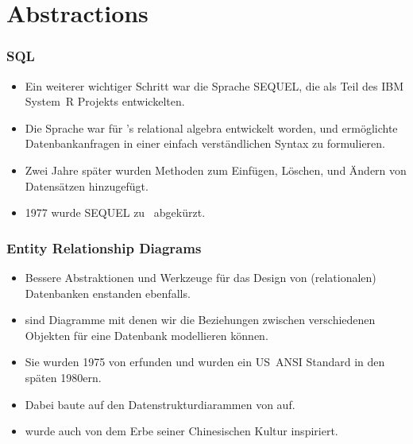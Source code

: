 \documentclass[aspectratio=169,mathserif,notheorems]{beamer}%
\begin{document}
\section{Abstractions}%
%
\begin{frame}[fragile,t]
\frametitle{SQL}%
\begin{itemize}%
\item Ein weiterer wichtiger Schritt war die Sprache SEQUEL, die \citeauthor{CB1974SASEQL} \citeyear{CB1974SASEQL} als Teil des IBM System~R Projekts entwickelten\cite{CB1974SASEQL}.%
\item<2-> Die Sprache war für \citeauthor{C1970ARMODFLSDB}'s relational algebra entwickelt worden, und ermöglichte Datenbankanfragen in einer einfach verständlichen Syntax zu formulieren.%
\item<3-> Zwei Jahre später wurden Methoden zum Einfügen, Löschen, und Ändern von Datensätzen hinzugefügt\cite{CAEGLMRB1976S2AUATDDMAC}.%
\item<4-> 1977 wurde SEQUEL zu \sql\ abgekürzt\cite{C20245YOQ}.%
\end{itemize}%
%
%
\end{frame}
%
\begin{frame}%
\frametitle{Entity Relationship Diagrams}%
\begin{itemize}%
\item Bessere Abstraktionen und Werkzeuge für das Design von (relationalen) Datenbanken enstanden ebenfalls.%
\item<2->  sind Diagramme mit denen wir die Beziehungen zwischen verschiedenen Objekten für eine Datenbank modellieren können\cite{KW2012ASHOTEDAIM,C1976TERMTAUVOD}.%
\item<3-> Sie wurden 1975 von \citeauthor{C1975TRMTAUVOD}\cite{C1975TRMTAUVOD} erfunden und wurden ein US~ANSI Standard in den späten 1980ern\cite{GK1985ATOOTIRDS,P1992IAX1ASFIRDSI}.%
\item<4-> Dabei baute \citeauthor{C1975TRMTAUVOD} auf den Datenstrukturdiarammen von \citeauthor{B1969DSD}\cite{B1969DSD} auf.%
\item<5->  wurde auch von dem Erbe seiner Chinesischen Kultur inspiriert\cite{C1997ECAED,C2002ERMHEFTALL}.%
\end{itemize}%
%
%
%
%
%
\end{frame}%
%
\end{document}
